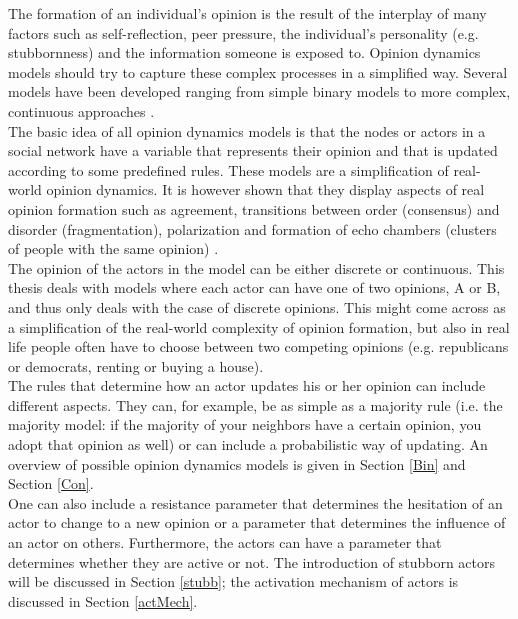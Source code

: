 \documentclass[11 pt , letterpaper , twoside , openright]{book}
\begin{document}
The formation of an individual's opinion is the result of the interplay of many factors such as self-reflection, peer pressure, the individual's personality (e.g. stubbornness) and the information someone is exposed to. Opinion dynamics models should try to capture these complex processes in a simplified way. Several models have been developed ranging from simple binary models to more complex, continuous approaches \cite{Sirbu2016}.\\
\newline
The basic idea of all opinion dynamics models is that the nodes or actors in a social network have a variable that represents their opinion and that is updated according to some predefined rules. These models are a simplification of real-world opinion dynamics. It is however shown that they display aspects of real opinion formation such as agreement, transitions between order (consensus) and disorder (fragmentation), polarization and formation of echo chambers (clusters of people with the same opinion) \cite{Sirbu2016}. \\
\newline
The opinion of the actors in the model can be either discrete or continuous. This thesis deals with models where each actor can have one of two opinions, A or B, and thus only deals with the case of discrete opinions. This might come across as a simplification of the real-world complexity of opinion formation, but also in real life people often have to choose between two competing opinions (e.g. republicans or democrats, renting or buying a house). \\
\newline
The rules that determine how an actor updates his or her opinion can include different aspects. They can, for example, be as simple as a majority rule (i.e. the majority model: if the majority of your neighbors have a certain opinion, you adopt that opinion as well) or can include a probabilistic way of updating. An overview of possible opinion dynamics models is given in Section \ref{Bin} and Section \ref{Con}. \\
\newline
One can also include a resistance parameter that determines the hesitation of an actor to change to a new opinion or a parameter that determines the influence of an actor on others. Furthermore, the actors can have a parameter that determines whether they are active or not. The introduction of stubborn actors will be discussed in Section \ref{stubb}; the activation mechanism of actors is discussed in Section \ref{actMech}.\\
\end{document}
